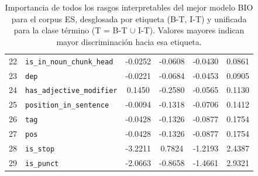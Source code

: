 \begin{table}[ht]
\begin{tabular}{@{} r l c c c c @{}}
22 & \texttt{is\_in\_noun\_chunk\_head} & -0.0252 & -0.0608 & -0.0430 & 0.0861 \\
23 & \texttt{dep} & -0.0221 & -0.0684 & -0.0453 & 0.0905 \\
24 & \texttt{has\_adjective\_modifier} & 0.1450 & -0.2580 & -0.0565 & 0.1130 \\
25 & \texttt{position\_in\_sentence} & -0.0094 & -0.1318 & -0.0706 & 0.1412 \\
26 & \texttt{tag} & -0.0428 & -0.1326 & -0.0877 & 0.1754 \\
27 & \texttt{pos} & -0.0428 & -0.1326 & -0.0877 & 0.1754 \\
28 & \texttt{is\_stop} & -3.2211 & 0.7824 & -1.2193 & 2.4387 \\
29 & \texttt{is\_punct} & -2.0663 & -0.8658 & -1.4661 & 2.9321 \\
\bottomrule
\end{tabular}
\caption{Importancia de todos los rasgos interpretables del mejor modelo BIO para el corpus ES, desglosada por etiqueta (B-T, I-T) y unificada para la clase término (T = B-T $\cup$ I-T). Valores mayores indican mayor discriminación hacia esa etiqueta.}
\label{tab:bio_importancia_es}
\normalsize
\end{table}